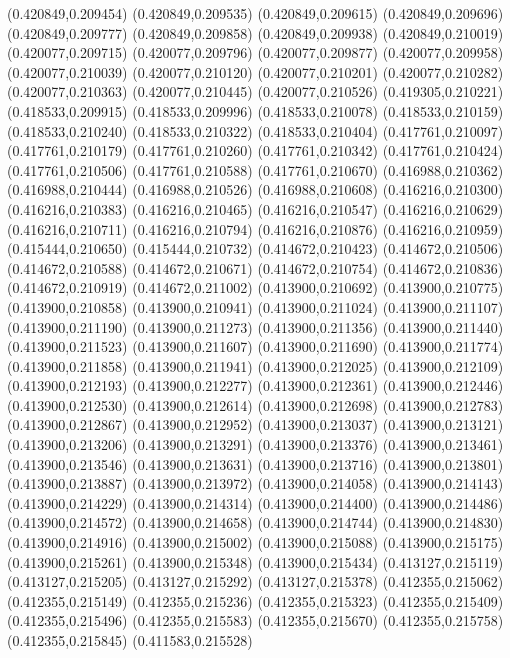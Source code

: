 (0.420849,0.209454)
(0.420849,0.209535)
(0.420849,0.209615)
(0.420849,0.209696)
(0.420849,0.209777)
(0.420849,0.209858)
(0.420849,0.209938)
(0.420849,0.210019)
(0.420077,0.209715)
(0.420077,0.209796)
(0.420077,0.209877)
(0.420077,0.209958)
(0.420077,0.210039)
(0.420077,0.210120)
(0.420077,0.210201)
(0.420077,0.210282)
(0.420077,0.210363)
(0.420077,0.210445)
(0.420077,0.210526)
(0.419305,0.210221)
(0.418533,0.209915)
(0.418533,0.209996)
(0.418533,0.210078)
(0.418533,0.210159)
(0.418533,0.210240)
(0.418533,0.210322)
(0.418533,0.210404)
(0.417761,0.210097)
(0.417761,0.210179)
(0.417761,0.210260)
(0.417761,0.210342)
(0.417761,0.210424)
(0.417761,0.210506)
(0.417761,0.210588)
(0.417761,0.210670)
(0.416988,0.210362)
(0.416988,0.210444)
(0.416988,0.210526)
(0.416988,0.210608)
(0.416216,0.210300)
(0.416216,0.210383)
(0.416216,0.210465)
(0.416216,0.210547)
(0.416216,0.210629)
(0.416216,0.210711)
(0.416216,0.210794)
(0.416216,0.210876)
(0.416216,0.210959)
(0.415444,0.210650)
(0.415444,0.210732)
(0.414672,0.210423)
(0.414672,0.210506)
(0.414672,0.210588)
(0.414672,0.210671)
(0.414672,0.210754)
(0.414672,0.210836)
(0.414672,0.210919)
(0.414672,0.211002)
(0.413900,0.210692)
(0.413900,0.210775)
(0.413900,0.210858)
(0.413900,0.210941)
(0.413900,0.211024)
(0.413900,0.211107)
(0.413900,0.211190)
(0.413900,0.211273)
(0.413900,0.211356)
(0.413900,0.211440)
(0.413900,0.211523)
(0.413900,0.211607)
(0.413900,0.211690)
(0.413900,0.211774)
(0.413900,0.211858)
(0.413900,0.211941)
(0.413900,0.212025)
(0.413900,0.212109)
(0.413900,0.212193)
(0.413900,0.212277)
(0.413900,0.212361)
(0.413900,0.212446)
(0.413900,0.212530)
(0.413900,0.212614)
(0.413900,0.212698)
(0.413900,0.212783)
(0.413900,0.212867)
(0.413900,0.212952)
(0.413900,0.213037)
(0.413900,0.213121)
(0.413900,0.213206)
(0.413900,0.213291)
(0.413900,0.213376)
(0.413900,0.213461)
(0.413900,0.213546)
(0.413900,0.213631)
(0.413900,0.213716)
(0.413900,0.213801)
(0.413900,0.213887)
(0.413900,0.213972)
(0.413900,0.214058)
(0.413900,0.214143)
(0.413900,0.214229)
(0.413900,0.214314)
(0.413900,0.214400)
(0.413900,0.214486)
(0.413900,0.214572)
(0.413900,0.214658)
(0.413900,0.214744)
(0.413900,0.214830)
(0.413900,0.214916)
(0.413900,0.215002)
(0.413900,0.215088)
(0.413900,0.215175)
(0.413900,0.215261)
(0.413900,0.215348)
(0.413900,0.215434)
(0.413127,0.215119)
(0.413127,0.215205)
(0.413127,0.215292)
(0.413127,0.215378)
(0.412355,0.215062)
(0.412355,0.215149)
(0.412355,0.215236)
(0.412355,0.215323)
(0.412355,0.215409)
(0.412355,0.215496)
(0.412355,0.215583)
(0.412355,0.215670)
(0.412355,0.215758)
(0.412355,0.215845)
(0.411583,0.215528)
